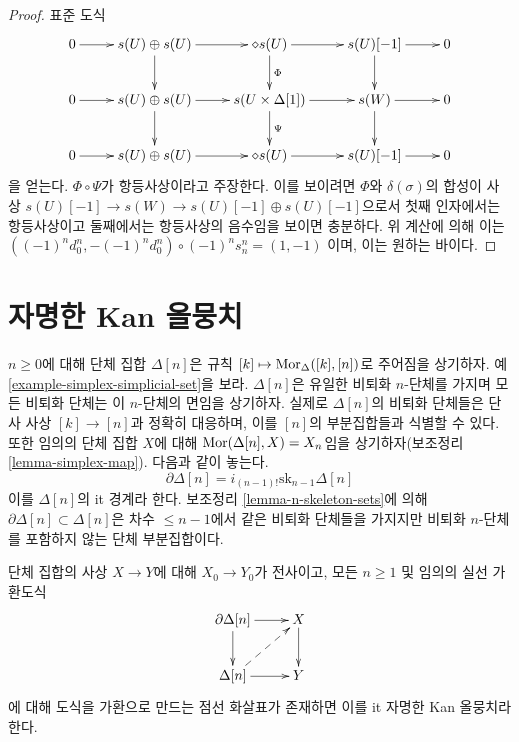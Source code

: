 \begin{proof}
\medskip\noindent
표준 도식
$$
\xymatrix{
0 \ar[r] &
s(U) \oplus s(U) \ar[r] \ar[d] &
\diamond{s(U)} \ar[r] \ar[d]^{\Phi}&
s(U)[-1] \ar[r] \ar[d] &
0 \\
0 \ar[r] &
s(U) \oplus s(U) \ar[r] \ar[d] &
s(U \times \Delta[1]) \ar[r] \ar[d]^\Psi &
s(W) \ar[r] \ar[d] &
0 \\
0 \ar[r] &
s(U) \oplus s(U) \ar[r] &
\diamond{s(U)} \ar[r] &
s(U)[-1] \ar[r] &
0
}
$$
을 얻는다. $\Phi \circ \Psi$가 항등사상이라고 주장한다.
이를 보이려면 $\Phi$와 $\delta(\sigma)$의 합성이 사상
$s(U)[-1] \to s(W) \to s(U)[-1] \oplus s(U)[-1]$으로서 첫째
인자에서는 항등사상이고 둘째에서는 항등사상의 음수임을 보이면
충분하다. 위 계산에 의해 이는
$((-1)^nd^n_0, -(-1)^nd^n_0) \circ (-1)^n s^n_n = (1, -1)$
이며, 이는 원하는 바이다.
\end{proof}









\section{자명한 Kan 올뭉치}
\label{section-trivial-kan}

\noindent
$n \geq 0$에 대해 단체 집합 $\Delta[n]$은 규칙
$[k] \mapsto \mathop{\mathrm{Mor}}\nolimits_\Delta([k], [n])$로 주어짐을 상기하자. 예
\ref{example-simplex-simplicial-set}을 보라. $\Delta[n]$은 유일한
비퇴화 $n$-단체를 가지며 모든 비퇴화 단체는 이 $n$-단체의 면임을
상기하자. 실제로 $\Delta[n]$의 비퇴화 단체들은 단사 사상
$[k] \to [n]$과 정확히 대응하며, 이를 $[n]$의 부분집합들과 식별할 수
있다. 또한 임의의 단체 집합 $X$에 대해
$\mathop{\mathrm{Mor}}\nolimits(\Delta[n], X) = X_n$임을 상기하자(보조정리
\ref{lemma-simplex-map}). 다음과 같이 놓는다.
$$
\partial \Delta[n] = i_{(n - 1)!}\text{sk}_{n - 1}\Delta[n]
$$
이를 $\Delta[n]$의 {it 경계}라 한다. 보조정리
\ref{lemma-n-skeleton-sets}에 의해
$\partial \Delta[n] \subset \Delta[n]$은 차수 $\leq n - 1$에서 같은
비퇴화 단체들을 가지지만 비퇴화 $n$-단체를 포함하지 않는 단체
부분집합이다.

\begin{definition}
\label{definition-trivial-kan}
단체 집합의 사상 $X \to Y$에 대해 $X_0 \to Y_0$가 전사이고, 모든
$n \geq 1$ 및 임의의 실선 가환도식
$$
\xymatrix{
\partial \Delta[n] \ar[r] \ar[d] & X \ar[d] \\
\Delta[n] \ar[r] \ar@{-->}[ru] & Y
}
$$
에 대해 도식을 가환으로 만드는 점선 화살표가 존재하면 이를
{it 자명한 Kan 올뭉치}라 한다.
\end{definition}

